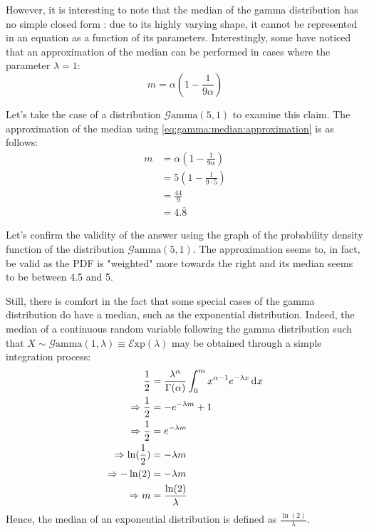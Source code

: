\documentclass[12pt]{article}
\newcommand{\E}{\mathcal{E}}
\newcommand{\G}{\mathcal{G}}
\begin{document}
However, it is interesting to note that the median of the gamma distribution has no simple closed form : due to its
highly varying shape, it cannot be represented in an equation as a function of its parameters. Interestingly, some have
noticed that an approximation of the median can be performed in cases where the parameter
$\lambda=1$\cite{wikipediaGammaDistribution2022}:
\begin{equation}\label{eq:gamma:median:approximation}
	m = \alpha(1-\frac{1}{9\alpha})
\end{equation}

Let's take the case of a distribution $\G\text{amma}(5, 1)$ to examine this claim. The approximation of the median using
\autoref{eq:gamma:median:approximation} is as follows:
\begin{equation}
	\begin{split}
		m	&=	\alpha(1-\frac{1}{9\alpha})\\
			&=	5(1-\frac{1}{9\cdot 5})\\
			&=	\frac{44}{9}\\
			&=	4.\bar{8}
	\end{split}
\end{equation}

Let's confirm the validity of the answer using the graph of the probability density function of the distribution
$\G\text{amma}(5, 1)$.
The approximation seems to, in fact, be valid as the PDF is "weighted" more towards the right and its median seems to be
between 4.5 and 5.

Still, there is comfort in the fact that some special cases of the gamma distribution do have a
median, such as the exponential distribution. Indeed, the median of a continuous random variable following the gamma
distribution such that $X\sim\G\text{amma}(1, \lambda)\equiv\E\text{xp}(\lambda)$ may be obtained through a simple
integration process:
\begin{equation}
	\begin{split}
		\frac{1}{2}					&=	\frac{\lambda^\alpha}{\Gamma(\alpha)} \int^m_0 x^{\alpha-1} e^{-\lambda x}\mathop{}\!\mathrm{d^{}}x\\
		\Rightarrow\frac{1}{2}		&=	-e^{-\lambda m} + 1\\
		\Rightarrow\frac{1}{2}		&=	e^{-\lambda m}\\
		\Rightarrow\ln(\frac{1}{2})	&=	-\lambda m\\
		\Rightarrow-\ln(2)			&=	-\lambda m\\
		\Rightarrow m				&=	\frac{\ln(2)}{\lambda}
	\end{split}
\end{equation}
Hence, the median of an exponential distribution is defined as $\frac{\ln(2)}{\lambda}$.
\end{document}
